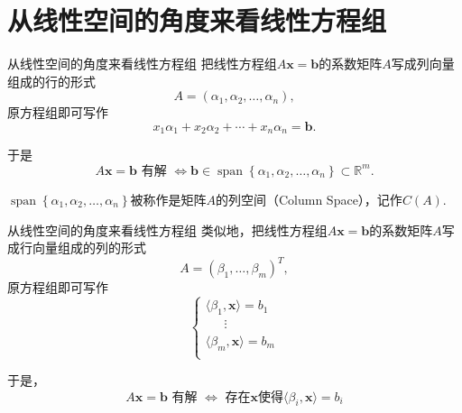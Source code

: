 
\section{从线性空间的角度来看线性方程组}


\begin{frame}

\begin{block}{从线性空间的角度来看线性方程组}
把线性方程组$A\mathbf{x} = \mathbf{b}$的系数矩阵$A$写成列向量组成的行的形式
\[A = (\alpha_1, \alpha_2, \ldots, \alpha_n),\]
原方程组即可写作
\[x_1\alpha_1 + x_2\alpha_2 + \cdots + x_n\alpha_n = \mathbf{b}.\]

\pause

于是
\[A\mathbf{x} = \mathbf{b} \text{ 有解 } \Longleftrightarrow \mathbf{b} \in \operatorname{span}\left\{ \alpha_1, \alpha_2, \ldots, \alpha_n \right\} \subset \mathbb{R}^m.\]

$\operatorname{span}\left\{ \alpha_1, \alpha_2, \ldots, \alpha_n \right\}$被称作是矩阵$A$的列空间（Column Space），记作$C(A)$.
\end{block}

\end{frame}


\begin{frame}

\begin{block}{从线性空间的角度来看线性方程组}
类似地，把线性方程组$A\mathbf{x} = \mathbf{b}$的系数矩阵$A$写成行向量组成的列的形式
\[A = (\beta_1, \ldots, \beta_m)^T,\]
原方程组即可写作
\[\begin{cases}
\langle \beta_1, \mathbf{x} \rangle = b_1 \\
\phantom{yyy} \vdots \\
\langle \beta_m, \mathbf{x} \rangle = b_m \\
\end{cases}\]

\pause

于是，
\[A\mathbf{x} = \mathbf{b} \text{ 有解 } \Longleftrightarrow \text{ 存在$\mathbf{x}$使得$\langle \beta_i, \mathbf{x} \rangle = b_i$}\]
\end{block}

\end{frame}

